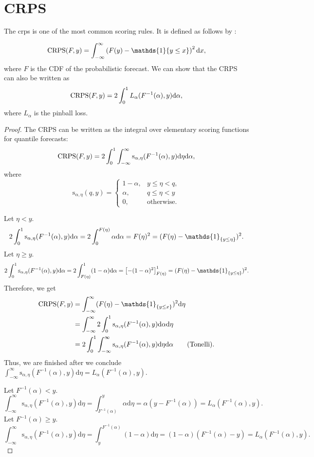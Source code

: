 \section{CRPS}
\label{ch:crps}

\renewcommand{\d}{\mathrm{d}}

The \gls{crps} is one of the most common 
scoring rules. It is defined as follows by \Textcite{Gneiting2014}: 

\[ \CRPS(F, y) = \int_{-\infty}^\infty \left( F(y) - \mathds{1} \{y \leq x\} \right)^2 \d x, \]
where \(F\) is the CDF of the probabilistic forecast.
We can show that the CRPS can also be written as 
\[ \CRPS(F, y) = 2 \int_0^1 L_\alpha(F^{-1}(\alpha), y) \d \alpha, \]
where \(L_\alpha\) is the pinball loss.
\begin{proof}
    The CRPS can be written as the integral over elementary scoring functions for quantile forecasts: 
    \[ \CRPS(F, y) = 2 \int_0^1 \int_{-\infty}^\infty \mathrm{s}_{\alpha, \eta}(F^{-1}(\alpha), y) \d \eta \d \alpha, \]
    where 
    \[ \mathrm{s}_{\alpha, \eta}(q, y) = \begin{cases}
        1-\alpha, &y\leq \eta < q, \\
        \alpha, &q\leq \eta < y \\
        0, &\text{otherwise}.
    \end{cases} \]

    Let \(\eta < y\). 
    \[ 2 \int_0^1 \mathrm{s}_{\alpha, \eta}(F^{-1}(\alpha), y) \d\alpha = 2 \int_0^{F(\eta)} \alpha \d \alpha = F(\eta)^2 = (F(\eta) - \mathds{1}_{\set{y \leq \eta}})^2. \]
    Let \(\eta \geq y\).
    \[ 2 \int_0^1 \mathrm{s}_{\alpha, \eta}(F^{-1}(\alpha), y) \d\alpha = 2 \int_{F(\eta)}^1 (1-\alpha) \d\alpha = \left[ - (1-\alpha)^2 \right]_{F(\eta)}^1 = (F(\eta) - \mathds{1}_{\set{y \leq \eta}})^2. \]
    Therefore, we get 
    \begin{align*}
        \CRPS(F, y) &= \int_{-\infty}^\infty (F(\eta) - \mathds{1}_{\set{y\leq x}})^2 \d \eta \\
        &= \int_{-\infty}^\infty 2 \int_0^1 \mathrm{s}_{\alpha, \eta}(F^{-1}(\alpha), y) \d \alpha \d \eta \\
        &= 2\int_0^1 \int_{-\infty}^\infty \mathrm{s}_{\alpha, \eta}(F^{-1}(\alpha), y) \d \eta \d \alpha  \tag{Tonelli}.
    \end{align*}
    Thus, we are finished after we conclude \(\int_{-\infty}^\infty \mathrm{s}_{\alpha, \eta}(F^{-1}(\alpha), y) \d \eta = L_\alpha(F^{-1}(\alpha), y)\).

    Let \(F^{-1}(\alpha) < y\). 
    \[ \int_{-\infty}^\infty \mathrm{s}_{\alpha, \eta}(F^{-1}(\alpha), y) \d \eta = \int_{F^{-1}(\alpha)}^y \alpha \d \eta = \alpha (y - F^{-1}(\alpha)) = L_\alpha(F^{-1}(\alpha), y). \]
    Let \(F^{-1}(\alpha) \geq y\). 
    \[ \int_{-\infty}^\infty \mathrm{s}_{\alpha, \eta}(F^{-1}(\alpha), y) \d \eta = \int_y^{F^{-1}(\alpha)} (1-\alpha) \d \eta = (1-\alpha) (F^{-1}(\alpha) - y) = L_\alpha(F^{-1}(\alpha), y). \]
\end{proof}